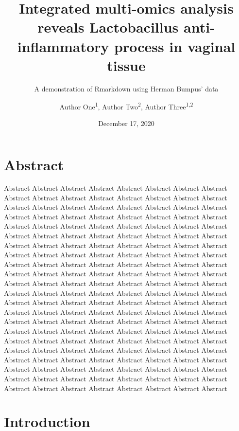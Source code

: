\documentclass[
]{article}
\title{Integrated multi-omics analysis reveals Lactobacillus anti-inflammatory process in vaginal tissue}
\subtitle{A demonstration of Rmarkdown using Herman Bumpus' data}
\author{Author One\textsuperscript{1},
Author Two\textsuperscript{2},
Author Three\textsuperscript{1,2}}
\date{December 17, 2020}
\begin{document}
\maketitle


\hypertarget{abstract}{%
\section{Abstract}\label{abstract}}

Abstract Abstract Abstract Abstract Abstract Abstract Abstract Abstract Abstract Abstract Abstract Abstract Abstract Abstract Abstract Abstract Abstract Abstract Abstract Abstract Abstract Abstract Abstract Abstract Abstract Abstract Abstract Abstract Abstract Abstract Abstract Abstract Abstract Abstract Abstract Abstract Abstract Abstract Abstract Abstract Abstract Abstract Abstract Abstract Abstract Abstract Abstract Abstract Abstract Abstract Abstract Abstract Abstract Abstract Abstract Abstract Abstract Abstract Abstract Abstract Abstract Abstract Abstract Abstract Abstract Abstract Abstract Abstract Abstract Abstract Abstract Abstract Abstract Abstract Abstract Abstract Abstract Abstract Abstract Abstract Abstract Abstract Abstract Abstract Abstract Abstract Abstract Abstract Abstract Abstract Abstract Abstract Abstract Abstract Abstract Abstract Abstract Abstract Abstract Abstract Abstract Abstract Abstract Abstract Abstract Abstract Abstract Abstract Abstract Abstract Abstract Abstract Abstract Abstract Abstract Abstract Abstract Abstract Abstract Abstract Abstract Abstract Abstract Abstract Abstract Abstract Abstract Abstract Abstract Abstract Abstract Abstract Abstract Abstract Abstract Abstract Abstract Abstract Abstract Abstract Abstract Abstract Abstract Abstract Abstract Abstract Abstract Abstract Abstract Abstract Abstract Abstract Abstract Abstract Abstract Abstract Abstract Abstract Abstract Abstract Abstract Abstract Abstract Abstract Abstract Abstract Abstract Abstract Abstract Abstract Abstract Abstract Abstract Abstract Abstract Abstract

\clearpage

\hypertarget{introduction}{%
\section{Introduction}\label{introduction}}
\end{document}
